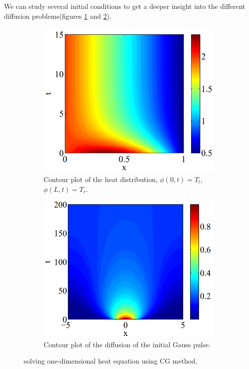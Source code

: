 We can study several initial conditions to get a deeper insight into the different diffusion problems(figures \ref{fig:1d-t-CG-LR} and \ref{fig:1d-t-CG-gaussianPulse}).

\begin{figure}
     \centering
     \begin{subfigure}[b]{0.45\textwidth}
         \centering
         \includegraphics[width=\textwidth]{1Dfig/result1D_CG_LR}
		 \caption{Contour plot of the heat distribution, $\phi(0,t)=T_l$, $\phi(L,t)=T_r$.}
 		 \label{fig:1d-t-CG-LR}
     \end{subfigure}
     \hfill
     \begin{subfigure}[b]{0.45\textwidth}
         \centering
         \includegraphics[width=\textwidth]{1Dfig/result1D_CG_gaussianPulse}
\caption{Contour plot of the diffusion of the initial Gauss pulse.}
\label{fig:1d-t-CG-gaussianPulse}
     \end{subfigure}
     
        \caption{solving one-dimensional heat equation using CG method.}
        \label{fig:1d-CG}
\end{figure}


